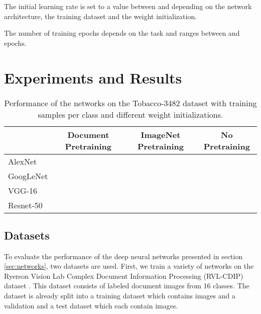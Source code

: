 \documentclass[conference]{IEEEtran}
\begin{document}
The initial learning rate is set to a value between  and  depending on the network architecture, the training dataset and the weight initialization.

The number of training epochs depends on the task and ranges between  and  epochs.


























 \section{Experiments and Results}

\begin{table*}
\renewcommand{\arraystretch}{1.3}
\centering
\caption{Performance of the networks on the Tobacco-3482 dataset with  training samples per class and different weight initializations.}
\begin{tabular}{l|c|c|c}
 & Document Pretraining & ImageNet Pretraining & No Pretraining \\\hline
AlexNet &  &  &  \\\hline
GoogLeNet &  &  &  \\\hline
VGG-16 &  &  &  \\\hline
Resnet-50 &  &  & 
\end{tabular}
\label{tab:accuracy_small}
\end{table*}



\subsection{Datasets}
To evaluate the performance of the deep neural networks presented in section \ref{sec:networks}, two datasets are used. First, we train a variety of networks on the Ryerson Vision Lab Complex Document Information Processing (RVL-CDIP) dataset \cite{harley2015evaluation}. This dataset consists of  labeled document images from 16 classes. The dataset is already split into a training dataset which contains  images and a validation and a test dataset which each contain  images.
\end{document}
